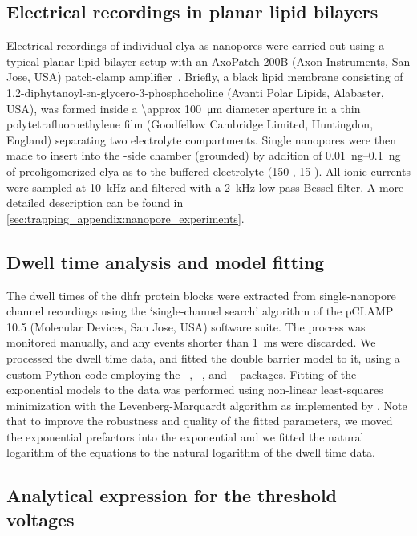 \subsection{Electrical recordings in planar lipid bilayers}
%

Electrical recordings of individual \gls{clya-as} nanopores were carried out using a typical planar lipid
bilayer setup with an AxoPatch 200B (Axon Instruments, San Jose, USA) patch-clamp
amplifier~\cite{Maglia-2010,Soskine-2012}. Briefly, a black lipid membrane consisting of
1,2-diphytanoyl-sn-glycero-3-phosphocholine (Avanti Polar Lipids, Alabaster, USA), was formed inside a
\SI{\approx 100}{\micro\meter} diameter aperture in a thin polytetrafluoroethylene film (Goodfellow Cambridge
Limited, Huntingdon, England) separating two electrolyte compartments. Single nanopores were then made to
insert into the \cisi{}-side chamber (grounded) by addition of \SIrange{0.01}{0.1}{\nano\gram} of
preoligomerized \gls{clya-as} to the buffered electrolyte (\SI{150}{\mM} , \SI{15}{\mM} 
). All ionic currents were sampled at \SI{10}{\kilo\hertz} and filtered with a \SI{2}{\kilo\hertz}
low-pass Bessel filter. A more detailed description can be found in
\cref{sec:trapping_appendix:nanopore_experiments}.


\subsection{Dwell time analysis and model fitting}
%

The dwell times of the \gls{dhfr} protein blocks were extracted from single-nanopore channel recordings using
the `single-channel search' algorithm of the pCLAMP 10.5 (Molecular Devices, San Jose, USA) software suite.
The process was monitored manually, and any events shorter than \SI{1}{\ms} were discarded. We processed the
dwell time data, and fitted the double barrier model to it, using a custom Python code employing the
~\cite{vanderWalt-2011}, ~\cite{McKinney-2010}, and ~\cite{Newville-2014}
packages. Fitting of the exponential models to the data was performed using non-linear least-squares
minimization with the Levenberg-Marquardt algorithm as implemented by . Note that to improve the
robustness and quality of the fitted parameters, we moved the exponential prefactors into the exponential and
we fitted the natural logarithm of the equations to the natural logarithm of the dwell time data.

\subsection{Analytical expression for the threshold voltages}
%

